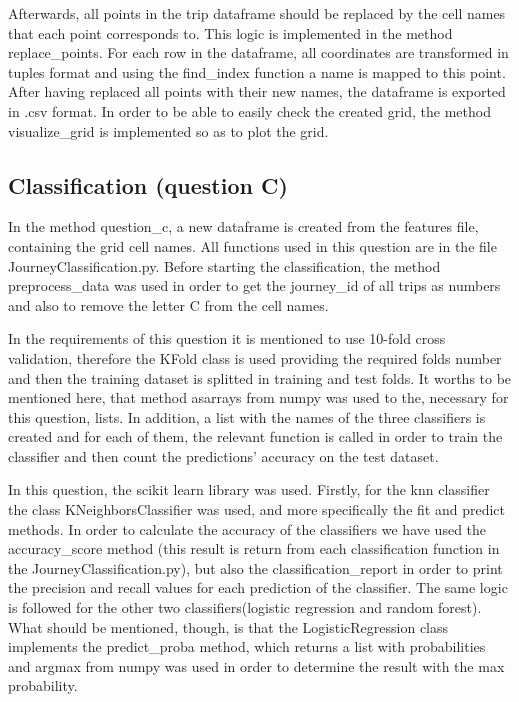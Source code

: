 \documentclass[12pt]{article}
\begin{document}
	Afterwards, all points in the trip dataframe should be replaced by the cell names that each point corresponds to. This logic is implemented in the method replace\_points. For each row in the dataframe, all coordinates are transformed in tuples format and using the find\_index function a name is mapped to this point. After having replaced all points with their new names, the dataframe is exported in .csv format. In order to be able to easily check the created grid, the method visualize\_grid is implemented so as to plot the grid. 
	
	\subsection{Classification (question C)}
	In the method question\_c, a new dataframe is created from the features file, containing the grid cell names. All functions used in this question are in the file JourneyClassification.py. Before starting the classification, the method preprocess\_data was used in order to get the journey\_id of all trips as numbers and also to remove the letter C from the cell names.
	
	In the requirements of this question it is mentioned to use 10-fold cross validation, therefore the KFold class is used providing the required folds number and then the training dataset is splitted in training and test folds. It worths to be mentioned here, that method asarrays from numpy was used to the, necessary for this question, lists. In addition, a list with the names of the three classifiers is created and for each of them, the relevant function is called in order to train the classifier and then count the predictions' accuracy on the test dataset. 
	
	In this question, the scikit learn library was used. Firstly, for the knn classifier the class KNeighborsClassifier was used, and more specifically the fit and predict methods. In order to calculate the accuracy of the classifiers we have used the accuracy\_score method (this result is return from each classification function in the JourneyClassification.py), but also the classification\_report in order to print the precision and recall values for each prediction of the classifier. The same logic is followed for the other two classifiers(logistic regression and random forest). What should be mentioned, though, is that the LogisticRegression class implements the predict\_proba method, which returns a list with probabilities and argmax from numpy was used in order to determine the result with the max probability.
	
\end{document}
